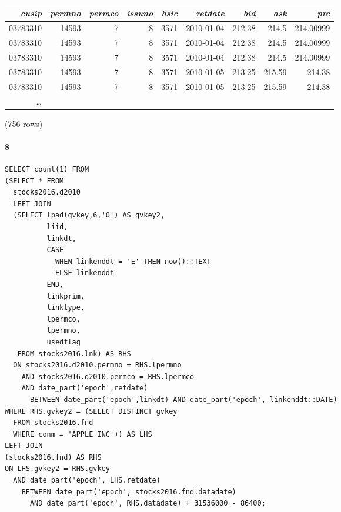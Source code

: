 \documentclass[]{article}
\let\oldparagraph\paragraph
\renewcommand{\paragraph}[1]{\oldparagraph{#1}\mbox{}}
\begin{document}
\begin{center}
\begin{tabular}{r | r | r | r | r | r | r | r | r}
\textit{cusip} & \textit{permno} & \textit{permco} & \textit{issuno} & \textit{hsic} & \textit{retdate} & \textit{bid} & \textit{ask} & \textit{prc} \\
\hline
03783310 & 14593 & 7 & 8 & 3571 & 2010-01-04 & 212.38 & 214.5 & 214.00999  \\
03783310 & 14593 & 7 & 8 & 3571 & 2010-01-04 & 212.38 & 214.5 & 214.00999  \\
03783310 & 14593 & 7 & 8 & 3571 & 2010-01-04 & 212.38 & 214.5 & 214.00999  \\
03783310 & 14593 & 7 & 8 & 3571 & 2010-01-05 & 213.25 & 215.59 & 214.38  \\
03783310 & 14593 & 7 & 8 & 3571 & 2010-01-05 & 213.25 & 215.59 & 214.38  \\
\ldots
\end{tabular}

\noindent (756 rows) \\
\end{center}

\paragraph{8}

\color{blue}
\begin{verbatim}
SELECT count(1) FROM
(SELECT * FROM
  stocks2016.d2010
  LEFT JOIN
  (SELECT lpad(gvkey,6,'0') AS gvkey2,
          liid,
          linkdt,
          CASE
            WHEN linkenddt = 'E' THEN now()::TEXT
            ELSE linkenddt
          END,
          linkprim,
          linktype,
          lpermco,
          lpermno,
          usedflag
   FROM stocks2016.lnk) AS RHS
  ON stocks2016.d2010.permno = RHS.lpermno
    AND stocks2016.d2010.permco = RHS.lpermco
    AND date_part('epoch',retdate)
      BETWEEN date_part('epoch',linkdt) AND date_part('epoch', linkenddt::DATE)
WHERE RHS.gvkey2 = (SELECT DISTINCT gvkey
  FROM stocks2016.fnd
  WHERE conm = 'APPLE INC')) AS LHS
LEFT JOIN
(stocks2016.fnd) AS RHS
ON LHS.gvkey2 = RHS.gvkey
  AND date_part('epoch', LHS.retdate)
    BETWEEN date_part('epoch', stocks2016.fnd.datadate)
      AND date_part('epoch', RHS.datadate) + 31536000 - 86400;
\end{verbatim}
\color{black}
\end{document}
